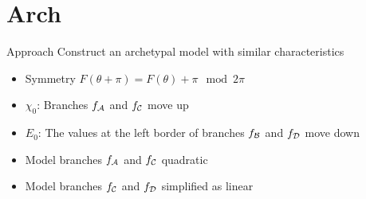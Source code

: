 \section{Arch}

\begin{frame}{Approach}
	\vspace{-1em}
	Construct an archetypal model with similar characteristics
	\pause
	\begin{itemize}
		\item Symmetry $F(\theta + \pi) = F(\theta) + \pi \mod 2\pi$ \hfill \cite{akyuz2022} \pause
		\item $\chi_0$: Branches $f_{\mathcal{A}}$ and $f_{\mathcal{C}}$ move up \pause
		\item $E_0$: The values at the left border of branches $f_{\mathcal{B}}$ and $f_{\mathcal{D}}$ move down \pause
		\item Model branches $f_{\mathcal{A}}$ and $f_{\mathcal{C}}$ quadratic \pause
		\item Model branches $f_{\mathcal{C}}$ and $f_{\mathcal{D}}$ simplified as linear
	\end{itemize}

	\begin{figure}
	\end{figure}
\end{frame}

